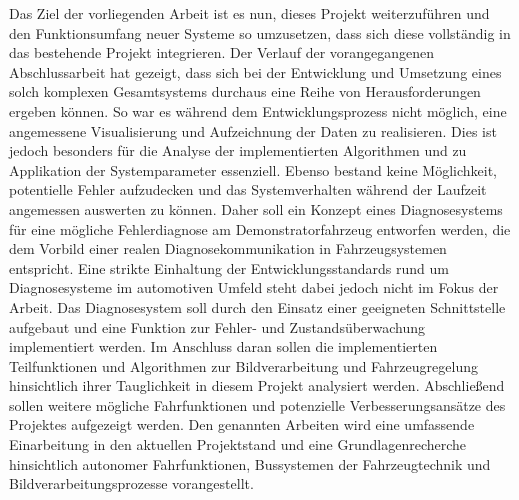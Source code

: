 Das Ziel der vorliegenden Arbeit ist es nun, dieses Projekt weiterzuführen und den Funktionsumfang neuer Systeme so umzusetzen, dass sich diese vollständig in das bestehende Projekt integrieren. Der Verlauf der vorangegangenen Abschlussarbeit hat gezeigt, dass sich bei der Entwicklung und Umsetzung eines solch komplexen Gesamtsystems durchaus eine Reihe von Herausforderungen ergeben können. So war es während dem Entwicklungsprozess nicht möglich, eine angemessene Visualisierung und Aufzeichnung der Daten zu realisieren. Dies ist jedoch besonders für die Analyse der implementierten Algorithmen und zu Applikation der Systemparameter essenziell. Ebenso bestand keine Möglichkeit, potentielle Fehler aufzudecken und das Systemverhalten während der Laufzeit angemessen auswerten zu können. Daher soll ein Konzept eines Diagnosesystems für eine mögliche Fehlerdiagnose am Demonstratorfahrzeug entworfen werden, die dem Vorbild einer realen Diagnosekommunikation in Fahrzeugsystemen entspricht. Eine strikte Einhaltung der Entwicklungsstandards rund um Diagnosesysteme im automotiven Umfeld steht dabei jedoch nicht im Fokus der Arbeit. Das Diagnosesystem soll durch den Einsatz einer geeigneten Schnittstelle aufgebaut und eine Funktion zur Fehler- und Zustandsüberwachung implementiert werden. Im Anschluss daran sollen die implementierten Teilfunktionen und Algorithmen zur Bildverarbeitung und Fahrzeugregelung hinsichtlich ihrer Tauglichkeit in diesem Projekt analysiert werden. Abschließend sollen weitere mögliche Fahrfunktionen und potenzielle Verbesserungsansätze des Projektes aufgezeigt werden.
Den genannten Arbeiten wird eine umfassende Einarbeitung in den aktuellen Projektstand und eine Grundlagenrecherche hinsichtlich autonomer Fahrfunktionen, Bussystemen der Fahrzeugtechnik und Bildverarbeitungsprozesse vorangestellt.